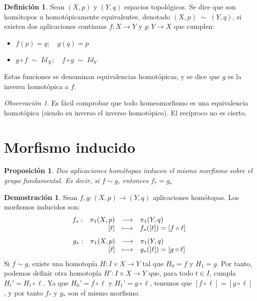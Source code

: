 \documentclass[12pt,twoside]{report}
\theoremstyle{azul}
\theoremstyle{azul2}
\theoremstyle{plain}
\newtheorem*{prop}{Proposición}
\theoremstyle{definition}
\newtheorem*{defi}{Definición}
\newtheorem*{dem}{Demostración}
\theoremstyle{remark}
\newtheorem*{obs}{Observación}
\newcommand\bigpi{\mathlarger{\pi}}
\begin{document}
\begin{defi}
Sean $(X,p)$ y $(Y,q)$ espacios topológicos. Se dice que son homótopos u homotópicamente equivalentes, denotado $(X,p) \; \sim \; (Y,q)$, si existen dos aplicaciones continuas $f : X \longrightarrow Y$ y $g : Y \longrightarrow X$ que cumplen:
\vspace{-4mm}
\begin{itemize}
    \item $f(p) = q; \quad g(q) = p$
    \item $g \circ f \;\sim\; Id_X; \quad f \circ g \;\sim\; Id_Y$
\end{itemize}
\vspace{-4mm}
Estas funciones se denominan equivalencias homotópicas, y se dice que $g$ es la inversa homotópica a $f$.
\end{defi}

\begin{obs}
Es fácil comprobar que todo homeomorfismo es una equivalencia homotópica (siendo su inverso el inverso homotópico). El recíproco no es cierto.
\end{obs}

\section{Morfismo inducido}
\begin{prop}
Dos aplicaciones homótopas inducen el mismo morfismo sobre el grupo fundamental. Es decir, si $f \sim g$, entonces $f_* = g _*$
\end{prop}
\begin{dem}
Sean $f,g : (X,p) \longrightarrow (Y,q)$ aplicaciones homótopas. Los morfismos inducidos son:
$$\begin{array}{rrcl}
     f_*:  & \bigpi _1(X, p) & \longrightarrow & \bigpi_1(Y, q) \\
     \; & [\ell] & \longmapsto & f_*([\ell])=[f \circ \ell]
\end{array}$$
$$\begin{array}{rrcl}
     g_*:  & \bigpi _1(X, p) & \longrightarrow & \bigpi_1(Y, q) \\
     \; & [\ell] & \longmapsto & g_*([\ell])=[g \circ \ell]
\end{array}$$
Si $f \sim g$, existe una homotopía $H:I\times X \rightarrow Y$ tal que $H_0 = f$ y $H_1 = g$. Por tanto, podemos definir otra homotopía $H': I\times X \rightarrow Y$ que, para todo $t \in I$, cumpla $H_t' = H_t \circ \ell$. Ya que $H_0' = f \circ \ell$ y $H_1' = g \circ \ell$, tenemos que $[f \circ \ell] = [g \circ \ell]$, y por tanto $f_*$ y $g_*$ son el mismo morfismo.
\end{dem}
\end{document}
